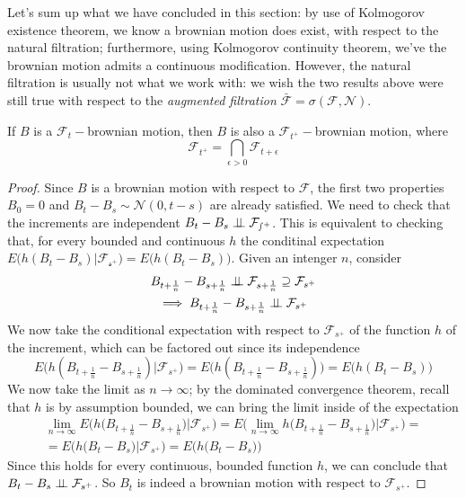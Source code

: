 Let's sum up what we have concluded in this section: by use of Kolmogorov existence theorem, we know a brownian motion does exist, with respect to the natural filtration; furthermore, using Kolmogorov continuity theorem, we've the brownian motion admits a continuous modification. However, the natural filtration is usually not what we work with: we wish the two results above were still true with respect to the \textit{augmented filtration} $\bar{\mathcal{F}} = \sigma(\mathcal{F},\mathcal{N})$. 

\begin{proposition}
    If $B$ is a $\mathcal{F}_t-$brownian motion, then $B$ is also a $\mathcal{F}_{t^+}-$brownian motion, where
    \begin{equation*}
        \mathcal{F}_{t^+} = \bigcap_{\epsilon > 0} \mathcal{F}_{t+\epsilon}
    \end{equation*}
\end{proposition}
\begin{proof}
    Since $B$ is a brownian motion with respect to $\mathcal{F}$, the first two properties $B_0 = 0$ and $B_t-B_s \sim \mathcal{N}(0,t-s)$ are already satisfied. We need to check that the increments are independent $B_t-B_s \perp \!\!\! \perp \mathcal{F_{s^+}}$. This is equivalent to checking that, for every bounded and continuous $h$ the conditinal expectation $E\big(h(B_t-B_s) \vert \mathcal{F_{s^+}} \big) = E\big(h(B_t-B_s) \big)$. Given an intenger $n$, consider
    \begin{gather*}
        B_{t+\frac{1}{n}}-B_{s+\frac{1}{n}} \perp \!\!\! \perp \mathcal{F}_{s+\frac{1}{n}} \supseteq \mathcal{F}_{s^+} \\
        \implies B_{t+\frac{1}{n}}-B_{s+\frac{1}{n}} \perp \!\!\! \perp \mathcal{F}_{s^+}
    \end{gather*}
    We now take the conditional expectation with respect to $\mathcal{F}_{s^+}$ of the function $h$ of the increment, which can be factored out since its independence
    \begin{equation*}
        E\big( h(B_{t+\frac{1}{n}}-B_{s+\frac{1}{n}}) \big\vert \mathcal{F}_{s^+} \big) = E\big( h(B_{t+\frac{1}{n}}-B_{s+\frac{1}{n}}) \big) = E\big(h(B_t-B_s)\big)
    \end{equation*}
    We now take the limit as $n \to \infty$; by the dominated convergence theorem, recall that $h$ is by assumption bounded, we can bring the limit inside of the expectation
    \begin{gather*}
        \lim_{n \to \infty} E\Big( h\big(B_{t+\frac{1}{n}}-B_{s+\frac{1}{n}}  \big) \Big\vert \mathcal{F}_{s^+} \Big) = E\Big( \lim_{n\to\infty} h\big( B_{t+\frac{1}{n}} - B_{s+\frac{1}{n}} \big) \Big\vert \mathcal{F}_{s^+} \Big) = \\
        = E\Big( h\big( B_t - B_s \big) \Big\vert \mathcal{F}_{s^+} \Big) = E\Big( h\big( B_t - B_s \big) \Big)
    \end{gather*}
    Since this holds for every continuous, bounded function $h$, we can conclude that $B_t - B_s \perp \!\!\! \perp \mathcal{F}_{s^+}$. So $B_t$ is indeed a brownian motion with respect to $\mathcal{F}_{s^+}$. 
\end{proof}


